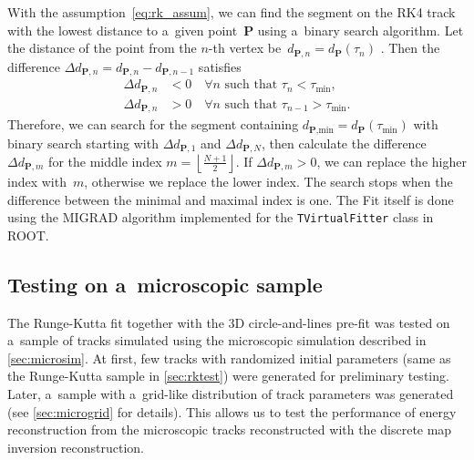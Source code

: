 		With the assumption~\ref{eq:rk_assum}, we can find the segment on the \ac{RK4} track with the lowest distance to a~given point~$\mathbf{P}$ using a~binary search algorithm. Let the distance of the point from the $n$\nobreakdash-th vertex %
		be~$d_{\mathbf{P},n} = d_{\mathbf{P}}(\tau_n)$%
		. Then the difference $\Delta d_{\mathbf{P},n} = d_{\mathbf{P},n}-d_{\mathbf{P},n-1}$ satisfies
			\begin{equation}
				\begin{aligned}
					\Delta d_{\mathbf{P},n} &< 0\quad \forall n \text{ such that } \tau_n < \tau_\text{min},\\
					\Delta d_{\mathbf{P},n} &> 0\quad \forall n \text{ such that } \tau_{n-1} > \tau_\text{min}.
				\end{aligned}
			\end{equation}
		Therefore, we can search for the segment containing $d_{\textbf{P},\text{min}} = d_{\mathbf{P}}(\tau_\text{min})$ with binary search starting with $\Delta d_{\mathbf{P},1}$ and $\Delta d_{\mathbf{P},N}$, then calculate the difference $\Delta d_{\mathbf{P},m}$ for the middle index $m = \left\lfloor\frac{N+1}{2}\right\rfloor$. If $\Delta d_{\mathbf{P},m} > 0$, we can replace the higher index with~$m$, otherwise we replace the lower index. The search stops when the difference between the minimal and maximal index is one. The Fit itself is done using the MIGRAD algorithm implemented for the \texttt{TVirtualFitter} class in ROOT.
		
		\subsection{Testing on a~microscopic sample}
			The Runge-Kutta fit together with the 3D circle-and-lines pre-fit was tested on a~sample of tracks simulated using the microscopic simulation described in \cref{sec:microsim}. At first, few tracks with randomized initial parameters (same as the Runge-Kutta sample in \cref{sec:rktest}) were generated for preliminary testing. Later, a~sample with a~grid-like distribution of track parameters was generated (see \cref{sec:microgrid} for details). This allows us to test the performance of energy reconstruction from the microscopic tracks reconstructed with the discrete map inversion reconstruction.
			
